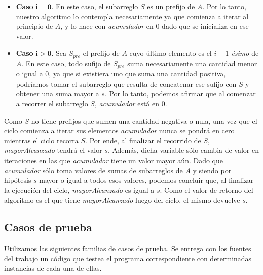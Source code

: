 \begin{itemize}
    \item \textbf{Caso} $\mathbf{i = 0}$. En este caso, el subarreglo $S$ es un prefijo de $A$. Por lo tanto, nuestro algoritmo lo contempla necesariamente ya que comienza a iterar al principio de $A$, y lo hace con \textit{acumulador} en $0$ dado que se inicializa en ese valor.

    \item \textbf{Caso} $\mathbf{i > 0}$. Sea $S_{pre}$ el prefijo de $A$ cuyo último elemento es el $i-1$\textit{-ésimo} de $A$. En este caso, todo sufijo de $S_{pre}$ suma necesariamente una cantidad menor o igual a $0$, ya que si existiera uno que suma una cantidad positiva, podríamos tomar el subarreglo que resulta de concatenar ese sufijo con $S$ y obtener una suma mayor a $s$. Por lo tanto, podemos afirmar que al comenzar a recorrer el subarreglo $S$, \textit{acumulador} está en $0$.
\end{itemize}

Como $S$ no tiene prefijos que sumen una cantidad negativa o nula, una vez que el ciclo comienza a iterar sus elementos \textit{acumulador} nunca se pondrá en cero mientras el ciclo recorra $S$. Por ende, al finalizar el recorrido de $S$, \textit{mayorAlcanzado} tendrá el valor $s$. Además, dicha variable sólo cambia de valor en iteraciones en las que \textit{acumulador} tiene un valor mayor aún. Dado que \textit{acumulador} sólo toma valores de sumas de subarreglos de $A$ y siendo por hipótesis $s$ mayor o igual a todos esos valores, podemos concluir que, al finalizar la ejecución del ciclo, \textit{mayorAlcanzado} es igual a $s$. Como el valor de retorno del algoritmo es el que tiene \textit{mayorAlcanzado} luego del ciclo, el mismo devuelve $s$.

\subsection{Casos de prueba}

Utilizamos las siguientes familias de casos de prueba. Se entrega con los fuentes del trabajo un código que testea el programa correspondiente con determinadas instancias de cada una de ellas.

